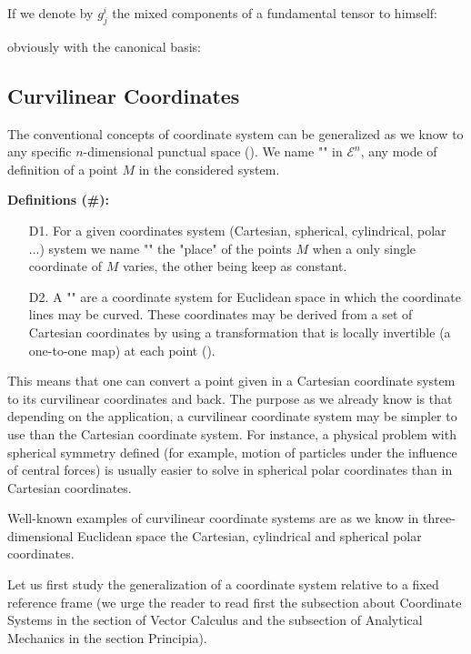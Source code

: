 	If we denote by $g_j^i$ the mixed components of a fundamental tensor to himself:
	
	obviously with the canonical basis:	
	
	
	\subsection{Curvilinear Coordinates}
	The conventional concepts of coordinate system can be generalized as we know to any specific $n$-dimensional punctual space (). We name "" in $\mathcal{E}^n$, any mode of definition of a point $M$ in the considered system.
	
	\textbf{Definitions (\#\mydef):} 
	\begin{enumerate}
		\item[D1.] For a given coordinates system (Cartesian, spherical, cylindrical, polar ...) system we name "" the "place" of the points $M$ when a only single coordinate of $M$ varies, the other being keep as constant.

		\item[D2.] A "\label{curvilinear coordinates tensor calculus}" are a coordinate system for Euclidean space in which the coordinate lines may be curved. These coordinates may be derived from a set of Cartesian coordinates by using a transformation that is locally invertible (a one-to-one map) at each point ().
	\end{enumerate}
	 This means that one can convert a point given in a Cartesian coordinate system to its curvilinear coordinates and back. The purpose as we already know is that depending on the application, a curvilinear coordinate system may be simpler to use than the Cartesian coordinate system. For instance, a physical problem with spherical symmetry defined (for example, motion of particles under the influence of central forces) is usually easier to solve in spherical polar coordinates than in Cartesian coordinates.
	 
	 Well-known examples of curvilinear coordinate systems are as we know in three-dimensional Euclidean space the Cartesian, cylindrical and spherical polar coordinates.
	 
	 Let us first study the generalization of a coordinate system relative to a fixed reference frame (we urge the reader to read first the subsection about Coordinate Systems in the section of Vector Calculus and the subsection of Analytical Mechanics in the section Principia).
	 
